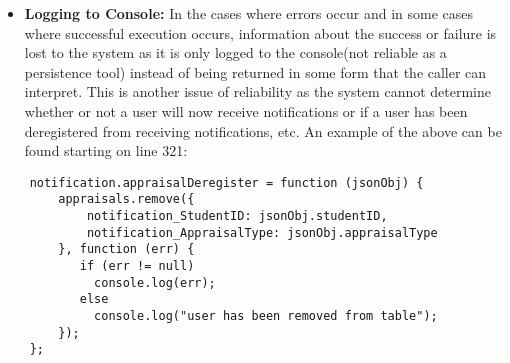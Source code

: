 \begin{itemize}
\item \textbf{Logging to Console:}\newline
     In the cases where errors occur and in some cases where successful execution occurs, information about the success or failure is lost to the system as it is only logged to the console(not reliable as a persistence tool) instead of being returned in some form that the caller can interpret. This is another issue of reliability as the system cannot determine whether or not a user will now receive notifications or if a user has been deregistered from receiving notifications, etc.
     An example of the above can be found starting on line 321: 
\end{itemize}
\begin{lstlisting}
    notification.appraisalDeregister = function (jsonObj) {
        appraisals.remove({
            notification_StudentID: jsonObj.studentID,
            notification_AppraisalType: jsonObj.appraisalType
        }, function (err) {
           if (err != null)
             console.log(err);
           else
             console.log("user has been removed from table");
        });
    };
\end{lstlisting}

